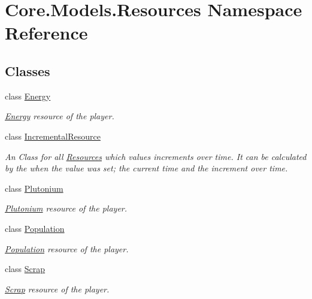 \hypertarget{namespaceCore_1_1Models_1_1Resources}{}\section{Core.\+Models.\+Resources Namespace Reference}
\label{namespaceCore_1_1Models_1_1Resources}
\subsection*{Classes}
\begin{DoxyCompactItemize}
\item 
class \hyperlink{classCore_1_1Models_1_1Resources_1_1Energy}{Energy}
\begin{DoxyCompactList}\small\item\em \hyperlink{classCore_1_1Models_1_1Resources_1_1Energy}{Energy} resource of the player. \end{DoxyCompactList}\item 
class \hyperlink{classCore_1_1Models_1_1Resources_1_1IncrementalResource}{Incremental\+Resource}
\begin{DoxyCompactList}\small\item\em An Class for all \hyperlink{namespaceCore_1_1Models_1_1Resources}{Resources} which values increments over time. It can be calculated by the when the value was set; the current time and the increment over time. \end{DoxyCompactList}\item 
class \hyperlink{classCore_1_1Models_1_1Resources_1_1Plutonium}{Plutonium}
\begin{DoxyCompactList}\small\item\em \hyperlink{classCore_1_1Models_1_1Resources_1_1Plutonium}{Plutonium} resource of the player. \end{DoxyCompactList}\item 
class \hyperlink{classCore_1_1Models_1_1Resources_1_1Population}{Population}
\begin{DoxyCompactList}\small\item\em \hyperlink{classCore_1_1Models_1_1Resources_1_1Population}{Population} resource of the player. \end{DoxyCompactList}\item 
class \hyperlink{classCore_1_1Models_1_1Resources_1_1Scrap}{Scrap}
\begin{DoxyCompactList}\small\item\em \hyperlink{classCore_1_1Models_1_1Resources_1_1Scrap}{Scrap} resource of the player. \end{DoxyCompactList}\item 

\end{DoxyCompactItemize}

